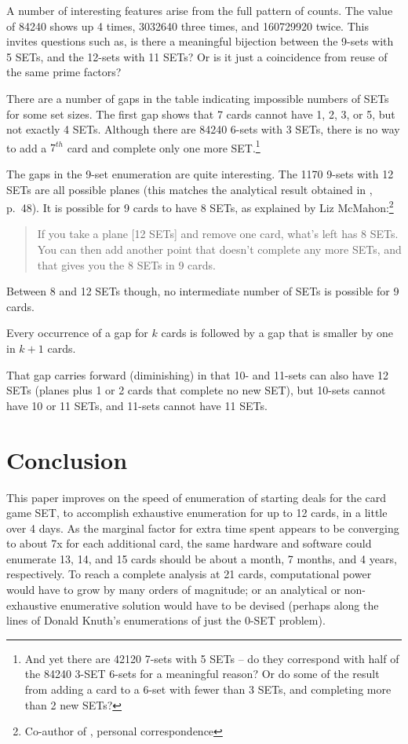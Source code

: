 \documentclass[10pt]{amsart}
\newcommand{\SET}{SET\texttrademark}  %
\begin{document}
A number of interesting features arise from the full pattern of counts. The
value of 84240 shows up 4 times, 3032640 three times, and 160729920 twice. This
invites questions such as, is there a meaningful bijection between the 9-sets
with 5 SETs, and the 12-sets with 11 SETs? Or is it just a coincidence from
reuse of the same prime factors?


There are a number of gaps in the table indicating impossible numbers of SETs
for some set sizes. The first gap shows that 7 cards cannot have 1, 2, 3, or 5,
but not exactly 4 SETs. Although there are 84240 6-sets with 3 SETs, there is no
way to add a $7^{th}$ card and complete only one more SET.\footnote{And yet
  there are 42120 7-sets with 5 SETs -- do they correspond with half of the
  84240 3-SET 6-sets for a meaningful reason? Or do some of the result from
  adding a card to a 6-set with fewer than 3 SETs, and completing more than 2
  new SETs?}

The gaps in the 9-set enumeration are quite interesting. The 1170 9-sets with 12
SETs are all possible planes (this matches the analytical result obtained in
\cite{JOS}, p.~48). It is possible for 9 cards to have 8 SETs, as explained by
Liz McMahon:\footnote{Co-author of \cite{JOS}, personal correspondence}
\begin{quote}
If you take a plane [12 SETs] and remove one card, what’s left has 8 SETs.  You
can then add another point that doesn’t complete any more SETs, and that gives
you the 8 SETs in 9 cards.
\end{quote}
Between 8 and 12 SETs though, no intermediate number of SETs is possible for 9
cards.

Every occurrence of a gap for $k$ cards is followed by a gap that is smaller by
one in $k+1$ cards. 


That gap carries forward (diminishing) in that 10- and 11-sets can also
have 12 SETs (planes plus 1 or 2 cards that complete no new SET), but 10-sets
cannot have 10 or 11 SETs, and 11-sets cannot have 11 SETs.



\section{Conclusion}
This paper improves on the speed of enumeration of starting deals for the card
game \SET, to accomplish exhaustive enumeration for up to 12 cards, in a little
over 4 days. As the marginal factor for extra time spent appears to be
converging to about 7x for each additional card, the same hardware and software
could enumerate 13, 14, and 15 cards should be about a month, 7 months, and 4
years, respectively. To reach a complete analysis at 21 cards, computational
power would have to grow by many orders of magnitude; or an analytical or
non-exhaustive enumerative solution would have to be devised (perhaps along the
lines of Donald Knuth's enumerations of just the 0-SET problem).
\end{document}
